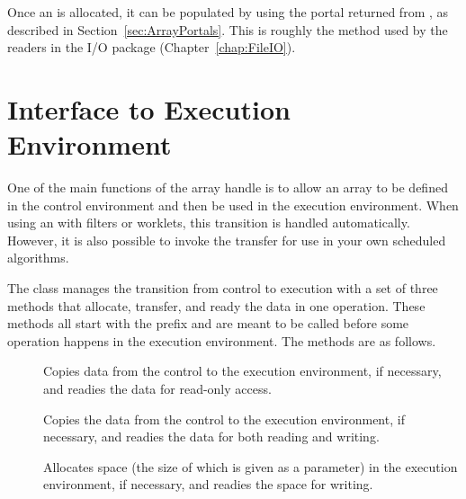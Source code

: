 
Once an  is allocated, it can be populated by
using the portal returned from , as described in
Section~\ref{sec:ArrayPortals}. This is roughly the method used by the
readers in the I/O package (Chapter~\ref{chap:FileIO}).



\section{Interface to Execution Environment}
\label{sec:ArrayHandle:InterfaceToExecutionEnvironment}


One of the main functions of the array handle is to allow an array to be
defined in the control environment and then be used in the execution
environment. When using an  with filters or
worklets, this transition is handled automatically. However, it is also
possible to invoke the transfer for use in your own scheduled algorithms.

The  class manages the transition from control
to execution with a set of three methods that allocate, transfer, and ready
the data in one operation. These methods all start with the prefix
 and are meant to be called before some operation happens
in the execution environment. The methods are as follows.

\begin{description}
\item[]  Copies data from
  the control to the execution environment, if necessary, and readies the
  data for read-only access.
\item[]  Copies the
  data from the control to the execution environment, if necessary, and
  readies the data for both reading and writing.
\item[]  Allocates space
  (the size of which is given as a parameter) in the execution environment,
  if necessary, and readies the space for writing.
\end{description}

